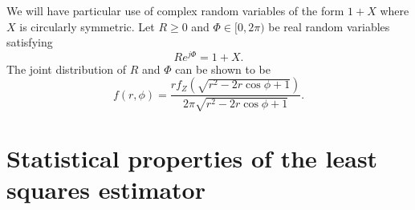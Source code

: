 \documentclass{article}
\begin{document}
We will have particular use of complex random variables of the form $1 + X$ where $X$ is circularly symmetric.  Let $R \geq 0$ and $\Phi \in [0,2\pi)$ be real random variables satisfying 
\[
R e^{j\Phi} = 1 + X.
\]
The joint distribution of $R$ and $\Phi$ can be shown to be
\[
f(r,\phi) = \frac{r f_Z(\sqrt{r^2 - 2r\cos\phi + 1})}{2\pi\sqrt{r^2 - 2r\cos\phi + 1}}.
\]







\section{Statistical properties of the least squares estimator}\label{sec:stat-prop-least}
\end{document}
